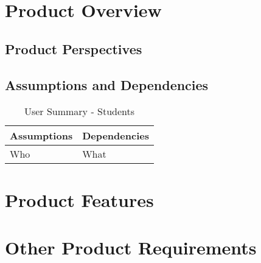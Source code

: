 \documentclass{article}
\begin{document}
\section{Product Overview}

\subsection{Product Perspectives}

\subsection{Assumptions and Dependencies}

\begin{table}[h!]
\begin{center}
\begin{tabular}{|p{5.5cm}|p{6.5cm}|}
\hline
\textbf{Assumptions} & \textbf{Dependencies} \\ \hline
Who & What\\ \hline

\end{tabular}
\caption{User Summary - Students}
\label{table:6}
\end{center}
\end{table}


\section{Product Features}

\section{Other Product Requirements}
\end{document}
